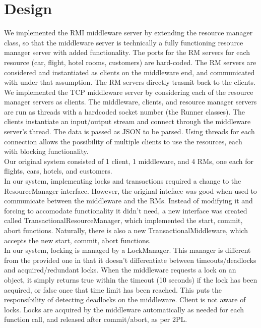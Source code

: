 \documentclass[letterpaper,12pt]{article}
\begin{document}
	\section{Design}
	
	We implemented the RMI middleware server by extending the resource manager class, so that the middleware server is technically a fully functioning resource manager server with added functionality. The ports for the RM servers for each resource (car, flight, hotel rooms, customers) are hard-coded. The RM servers are considered and instantiated as clients on the middleware end, and communicated with under that assumption. The RM servers directly trasmit back to the clients. \\
	
	We implemented the TCP middleware server by considering each of the resource manager servers as clients. The middleware, clients, and resource manager servers are run as threads with a hardcoded socket number (the Runner classes). The clients instantiate an input/output stream and connect through the middleware server's thread. The data is passed as JSON to be parsed. Using threads for each connection allows the possibility of multiple clients to use the resources, each with blocking functionality. \\
	
	Our original system consisted of 1 client, 1 middleware, and 4 RMs, one each for flights, cars, hotels, and customers.\\
	
	In our system, implementing locks and transactions required a change to the ResourceManager interface. However, the original inteface was good when used to communicate between the middleware and the RMs. Instead of modifying it and forcing to accomodate functionality it didn't need, a new interface was created called TransactionalResourceManager, which implemented the start, commit, abort functions. Naturally, there is also a new TransactionalMiddleware, which accepts the new start, commit, abort functions.\\
	
	In our system, locking is managed by a LockManager. This manager is different from the provided one in that it doesn't differentiate between timeouts/deadlocks and acquired/redundant locks. When the middleware requests a lock on an object, it simply returns true within the timeout (10 seconds) if the lock has been acquired, or false once that time limit has been reached. This puts the responsibility of detecting deadlocks on the middleware. Client is not aware of locks. Locks are acquired by the middleware automatically as needed for each function call, and released after commit/abort, as per 2PL.\\
	
\end{document}
